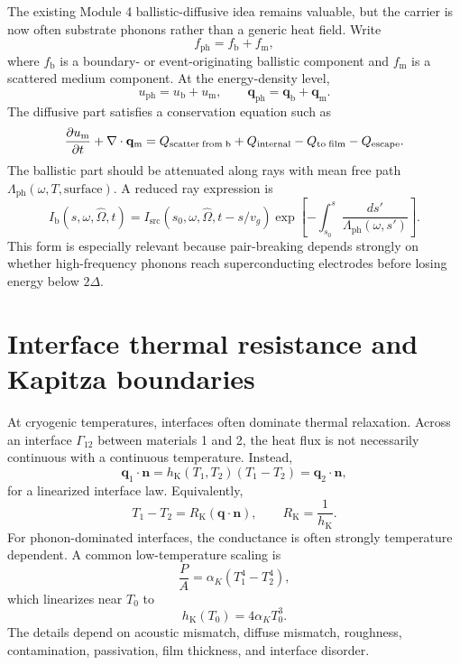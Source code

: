 \documentclass[11pt]{article}
\renewcommand{\mfp}{\Lambda}
\newcommand{\hK}{h_{\mathrm{K}}}
\newcommand{\RK}{R_{\mathrm{K}}}
\newcommand{\Jq}{\mathbf{q}}
\newcommand{\Jph}{\mathbf{q}_{\mathrm{ph}}}
\newcommand{\nvecb}{\mathbf{n}}
\begin{document}
The existing Module 4 ballistic-diffusive idea remains valuable, but the carrier is now often substrate phonons rather than a generic heat field. Write
\begin{equation}
f_{\mathrm{ph}}=f_{\mathrm{b}}+f_{\mathrm{m}},
\end{equation}
where \(f_{\mathrm{b}}
\) is a boundary- or event-originating ballistic component and \(f_{\mathrm{m}}\) is a scattered medium component. At the energy-density level,
\begin{equation}
u_{\mathrm{ph}} = u_{\mathrm{b}} + u_{\mathrm{m}},
\qquad
\Jph=\Jq_{\mathrm{b}}+\Jq_{\mathrm{m}}.
\end{equation}
The diffusive part satisfies a conservation equation such as
\begin{equation}
\pdv{u_{\mathrm{m}}}{t}+\nabla\cdot\Jq_{\mathrm{m}}
= Q_{\mathrm{scatter\;from\;b}}+Q_{\mathrm{internal}}-Q_{\mathrm{to\;film}}-Q_{\mathrm{escape}}.
\label{eq:um_sc}
\end{equation}
The ballistic part should be attenuated along rays with mean free path \(\mfp_{\mathrm{ph}}(\omega,T,\mathrm{surface})\). A reduced ray expression is
\begin{equation}
I_{\mathrm{b}}(s,\omega,\hat\Omega,t)
=I_{\mathrm{src}}(s_0,\omega,\hat\Omega,t-s/v_g)
\exp\left[-\int_{s_0}^{s}\frac{ds'}{\mfp_{\mathrm{ph}}(\omega,s')}\right].
\label{eq:ballistic_ray_sc}
\end{equation}
This form is especially relevant because pair-breaking depends strongly on whether high-frequency phonons reach superconducting electrodes before losing energy below \(2\Delta\).

\section{Interface thermal resistance and Kapitza boundaries}

At cryogenic temperatures, interfaces often dominate thermal relaxation. Across an interface \(\Gamma_{12}\) between materials 1 and 2, the heat flux is not necessarily continuous with a continuous temperature. Instead,
\begin{equation}
\Jq_1\cdot\nvecb = \hK(T_1,T_2)(T_1-T_2)
=\Jq_2\cdot\nvecb,
\label{eq:kapitza_linear}
\end{equation}
for a linearized interface law. Equivalently,
\begin{equation}
T_1-T_2=\RK \left(\Jq\cdot\nvecb\right),
\qquad \RK=\frac{1}{\hK}.
\label{eq:kapitza_R}
\end{equation}
For phonon-dominated interfaces, the conductance is often strongly temperature dependent. A common low-temperature scaling is
\begin{equation}
\frac{P}{A}=\alpha_K\left(T_1^4-T_2^4\right),
\label{eq:kapitza_T4}
\end{equation}
which linearizes near \(T_0\) to
\begin{equation}
\hK(T_0)=4\alpha_KT_0^3.
\label{eq:kapitza_linearized}
\end{equation}
The details depend on acoustic mismatch, diffuse mismatch, roughness, contamination, passivation, film thickness, and interface disorder.
\end{document}

